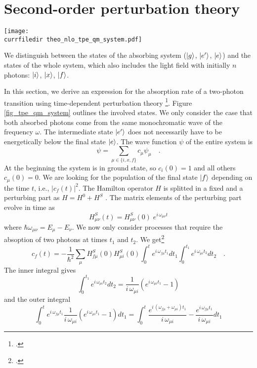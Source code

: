 \section{Second-order perturbation theory}

\begin{marginfigure}
\texttt{[image: \\currfiledir theo\_nlo\_tpe\_qm\_system.pdf]}
\caption{
We distinguish between the states of the absorbing system
($\ket{g}$, $\ket{e'}$, $\ket{e}$) and the states of the whole system, which
also includes the light field with initially $n$ photons: $\ket{i}$, $\ket{x}$, $\ket{f}$. }
\label{fig_tpe_qm_system}
\end{marginfigure}

In this section, we derive an expression for
the absorption rate of a two-photon transition using 
time-dependent perturbation theory
\footcite{Haken_wolf_II,mystre_quantum_optics}.
Figure \ref{fig_tpe_qm_system} outlines the involved
states. We only  consider the case
that both absorbed photons come from the same monochromatic
wave of the frequency $\omega$. The intermediate state 
$\ket{e'}$
does not necessarily have to be energetically below the final state $\ket{e}$.
The wave function $\psi$ of the entire system is
\begin{equation}
\psi = \sum_{\mu \in \{i, x, f\}} c_{\mu} \psi_{\mu} \quad.
\end{equation}
At the beginning the system is in ground state, so $c_i(0)
= 1$ and all others $c_{\mu}(0) = 0$. We are looking for the population
of the final state $\ket{f}$ depending on the time $t$, i.e.,
$|c_f(t)|^2$. The Hamilton operator $H$ is splitted in a fixed and a perturbing part as
 $H = H^0 + H^S$ . 
The matrix elements of the perturbing part evolve in time as
\begin{equation}
H^S_{\mu \nu} (t) = H^S_{\mu \nu} (0) \; e^{i \, \omega_{\mu \nu}
t}
\end{equation}
where $\hbar \omega_{\mu \nu} = E_{\mu} - E_{\nu}$.
We now only consider processes that require the absoption of two photons at times $t_1$ and $t_2$. We get\footcite{Haken_wolf_II}
\begin{equation}
c_f(t) = - \frac{1}{\hbar^2} \sum_{\mu} H^S_{f \mu} (0) H^S_{\mu
i} (0)\int_0^t e^{i \,\omega_{f \mu} t_1} dt_1 \int_0^{t_1} e^{i
\,\omega_{\mu i} t_2} dt_2 \quad .
\end{equation}
The inner integral gives
\begin{equation}
\int_0^{t_1} e^{i \,\omega_{\mu i} t_2} dt_2 =
\frac{1}{i \,\omega_{\mu i}} \left( e^{i \,\omega_{\mu i} t_1} -1
\right)
\end{equation}
and the outer integral
\begin{equation}
\int_0^t e^{i \,\omega_{f \mu} t_1} \frac{1}{i \,\omega_{\mu i}}
\left( e^{i \,\omega_{\mu i} t_1} -1 \right) dt_1 = %
\int_0^t  \frac{e^{i \,(\omega_{f \mu}+\omega_{ \mu i}) t_1}}{i
\,\omega_{\mu i}} %
-   \frac{e^{i \,\omega_{ f \mu } t_1}}{i \,\omega_{\mu i}} dt_1
\end{equation}

